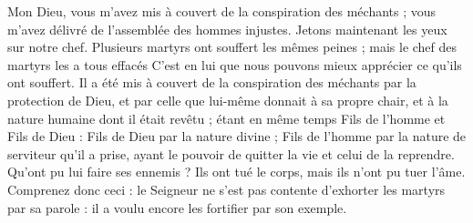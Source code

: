 Mon Dieu, vous m’avez mis à couvert de la conspiration des méchants ; vous m’avez délivré de l’assemblée des hommes injustes. Jetons maintenant les yeux sur notre chef. Plusieurs martyrs ont souffert les mêmes peines ; mais le chef des martyrs les a tous effacés C’est en lui que nous pouvons mieux apprécier ce qu’ils ont souffert. Il a été mis à couvert de la conspiration des méchants par la protection de Dieu, et par celle que lui-même donnait à sa propre chair, et à la nature humaine dont il était revêtu ; étant en même temps Fils de l’homme et Fils de Dieu : Fils de Dieu par la nature divine ; Fils de l’homme par la nature de serviteur qu’il a prise, ayant le pouvoir de quitter la vie et celui de la reprendre. Qu’ont pu lui faire ses ennemis ? Ils ont tué le corps, mais ils n’ont pu tuer l’âme. Comprenez donc ceci : le Seigneur ne s’est pas contente d’exhorter les martyrs par sa parole : il a voulu encore les fortifier par son exemple.